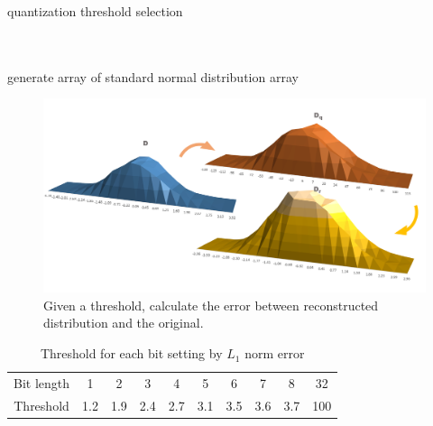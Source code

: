\begin{algorithm}
    \SetAlgoLined
    \caption{quantization threshold selection}
    \label{alg:th_choice}
    \begin{algorithmic}[1]
         \\
        \ENSURE{$\tau$} \\
        generate  array of standard normal distribution array\\
        \ENDFOR
    \end{algorithmic}
\end{algorithm}
\begin{figure}
    \centering
    \includegraphics[width=0.8\linewidth]{inc/3_low_numeric_convolution_neural_network/figure/nor_dist.png}
    \caption{Given a threshold, calculate the error between reconstructed distribution and the original.}
    \label{fig:th_choice}
\end{figure}
\begin{table}[h]
    \caption{Threshold for each bit setting by $L_1$ norm error}
    \label{tab:threshold}
    \centering
    \footnotesize 
        \begin{tabular}{c|ccccccccc}
        \toprule
            Bit length &1 & 2 & 3 & 4 & 5 & 6 & 7 & 8 & 32 \\
            Threshold &1.2 & 1.9& 2.4& 2.7& 3.1& 3.5& 3.6& 3.7& 100 \\
 
        \bottomrule
        \end{tabular}
\end{table}

